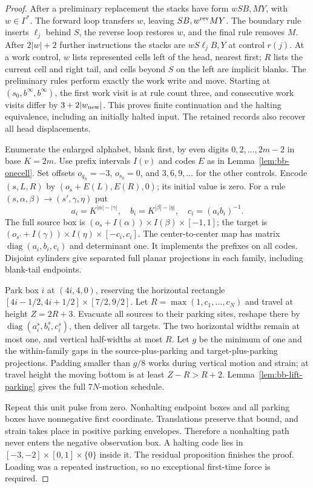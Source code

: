 \begin{proof}
After a preliminary replacement the stacks have form $wSB,MY$,
with $w\in\Gamma^*$.  The forward loop transfers $w$, leaving
$SB,w^{\rm rev}MY$.  The boundary rule inserts $\ell_j$ behind
$S$, the reverse loop restores $w$, and the final rule removes $M$.
After $2|w|+2$ further instructions the stacks are
$wS\ell_jB,Y$ at control $r(j)$.  At a work control, $w$ lists
represented cells left of the head, nearest first; $R$ lists the
current cell and right tail, and cells beyond $S$ on the left are
implicit blanks.  The preliminary rules perform exactly the work
write and move.  Starting at $(s_0,b^\infty,b^\infty)$, the first
work visit is at rule count three, and consecutive work visits differ
by $3+2|w_{\rm new}|$.  This proves finite continuation and the
halting equivalence, including an initially halted input.  The
retained records also recover all head displacements.

Enumerate the enlarged alphabet, blank first, by even digits
$0,2,\ldots,2m-2$ in base $K=2m$.  Use prefix intervals $I(v)$
and codes $E$ as in Lemma~\ref{lem:bb-onecell}.  Set offsets
$o_{q_h}=-3$, $o_{s_0}=0$, and $3,6,9,\ldots$ for the other controls.
Encode $(s,L,R)$ by $(o_s+E(L),E(R),0)$; its initial value is zero.
For a rule $(s,\alpha,\beta)\to(s',\gamma,\eta)$ put
\[
 a_i=K^{|\alpha|-|\gamma|},\quad
 b_i=K^{|\beta|-|\eta|},\quad c_i=(a_ib_i)^{-1}.
\]
The full source box is
$(o_s+I(\alpha))\times I(\beta)\times[-1,1]$;
the target is
$(o_{s'}+I(\gamma))\times I(\eta)\times[-c_i,c_i]$.
The center-to-center map has matrix $\operatorname{diag}(a_i,b_i,c_i)$
and determinant one.  It implements the prefixes on all codes.
Disjoint cylinders give separated full planar projections in each
family, including blank-tail endpoints.

Park box $i$ at $(4i,4,0)$, reserving the horizontal rectangle
$[4i-1/2,4i+1/2]\times[7/2,9/2]$.
Let $R=\max(1,c_1,\ldots,c_N)$ and travel at height $Z=2R+3$.
Evacuate all sources to their parking sites, reshape there by
$\operatorname{diag}(a_i^s,b_i^s,c_i^s)$, then deliver all targets.
The two horizontal widths remain at most one, and vertical half-widths
at most $R$.  Let $g$ be the minimum of one and the within-family
gaps in the source-plus-parking and target-plus-parking projections.
Padding smaller than $g/8$ works during vertical motion and strain;
at travel height the moving bottom is at least $Z-R>R+2$.
Lemma~\ref{lem:bb-lift-parking} gives the full $7N$-motion schedule.

Repeat this unit pulse from zero.  Nonhalting endpoint boxes and all
parking boxes have nonnegative first coordinate.  Translations preserve
that bound, and strain takes place in positive parking envelopes.
Therefore a nonhalting path never enters the negative observation box.
A halting code lies in $[-3,-2]\times[0,1]\times\{0\}$ inside it.
The residual proposition finishes the proof.  Loading was a repeated
instruction, so no exceptional first-time force is required.
\end{proof}


